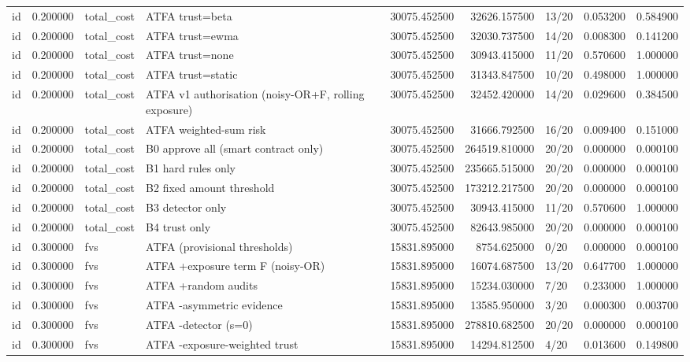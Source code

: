 \begin{tabular}{lrllrrlrr}
id & 0.200000 & total\_cost & ATFA trust=beta & 30075.452500 & 32626.157500 & 13/20 & 0.053200 & 0.584900 \\
id & 0.200000 & total\_cost & ATFA trust=ewma & 30075.452500 & 32030.737500 & 14/20 & 0.008300 & 0.141200 \\
id & 0.200000 & total\_cost & ATFA trust=none & 30075.452500 & 30943.415000 & 11/20 & 0.570600 & 1.000000 \\
id & 0.200000 & total\_cost & ATFA trust=static & 30075.452500 & 31343.847500 & 10/20 & 0.498000 & 1.000000 \\
id & 0.200000 & total\_cost & ATFA v1 authorisation (noisy-OR+F, rolling exposure) & 30075.452500 & 32452.420000 & 14/20 & 0.029600 & 0.384500 \\
id & 0.200000 & total\_cost & ATFA weighted-sum risk & 30075.452500 & 31666.792500 & 16/20 & 0.009400 & 0.151000 \\
id & 0.200000 & total\_cost & B0 approve all (smart contract only) & 30075.452500 & 264519.810000 & 20/20 & 0.000000 & 0.000100 \\
id & 0.200000 & total\_cost & B1 hard rules only & 30075.452500 & 235665.515000 & 20/20 & 0.000000 & 0.000100 \\
id & 0.200000 & total\_cost & B2 fixed amount threshold & 30075.452500 & 173212.217500 & 20/20 & 0.000000 & 0.000100 \\
id & 0.200000 & total\_cost & B3 detector only & 30075.452500 & 30943.415000 & 11/20 & 0.570600 & 1.000000 \\
id & 0.200000 & total\_cost & B4 trust only & 30075.452500 & 82643.985000 & 20/20 & 0.000000 & 0.000100 \\
id & 0.300000 & fvs & ATFA (provisional thresholds) & 15831.895000 & 8754.625000 & 0/20 & 0.000000 & 0.000100 \\
id & 0.300000 & fvs & ATFA +exposure term F (noisy-OR) & 15831.895000 & 16074.687500 & 13/20 & 0.647700 & 1.000000 \\
id & 0.300000 & fvs & ATFA +random audits & 15831.895000 & 15234.030000 & 7/20 & 0.233000 & 1.000000 \\
id & 0.300000 & fvs & ATFA -asymmetric evidence & 15831.895000 & 13585.950000 & 3/20 & 0.000300 & 0.003700 \\
id & 0.300000 & fvs & ATFA -detector (s=0) & 15831.895000 & 278810.682500 & 20/20 & 0.000000 & 0.000100 \\
id & 0.300000 & fvs & ATFA -exposure-weighted trust & 15831.895000 & 14294.812500 & 4/20 & 0.013600 & 0.149800 \\

\end{tabular}
